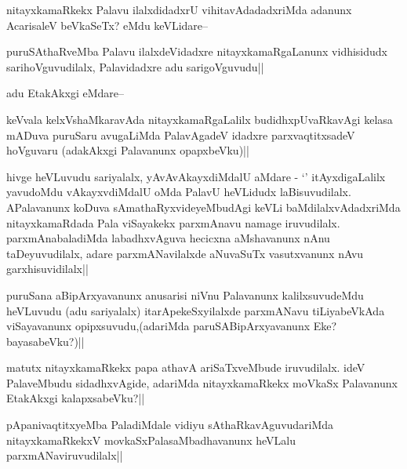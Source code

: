\begin{artha}
nitayxkamaRkekx Palavu ilalxdidadxrU vihitavAdadadxriMda adanunx AcarisaleV beVkaSeTx? eMdu keVLidare--
\end{artha}

\begin{artha}
puruSAthaRveMba Palavu ilalxdeVidadxre nitayxkamaRgaLanunx vidhisidudx sarihoVguvudilalx, Palavidadxre adu sarigoVguvudu||
\end{artha}

\begin{artha}
adu EtakAkxgi eMdare--
\end{artha}

\begin{artha}
keVvala kelxVshaMkaravAda  nitayxkamaRgaLalilx budidhxpUvaRkavAgi kelasa mADuva puruSaru avugaLiMda PalavAgadeV idadxre parxvaqtitxsadeV hoVguvaru (adakAkxgi Palavanunx opapxbeVku)||
\end{artha}


\begin{artha}
hivge heVLuvudu sariyalalx, yAvAvAkayxdiMdalU aMdare - `\stext' itAyxdigaLalilx yavudoMdu vAkayxvdiMdalU oMda PalavU heVLidudx laBisuvudilalx. APalavanunx koDuva sAmathaRyxvideyeMbudAgi keVLi baMdilalxvAdadxriMda nitayxkamaRdada Pala viSayakekx parxmAnavu namage iruvudilalx. parxmAnabaladiMda labadhxvAguva hecicxna aMshavanunx nAnu taDeyuvudilalx, adare parxmANavilalxde aNuvaSuTx vasutxvanunx nAvu garxhisuvidilalx||
\end{artha}

\begin{artha}
puruSana aBipArxyavanunx anusarisi niVnu Palavanunx kalilxsuvudeMdu heVLuvudu (adu 
sariyalalx) itarApekeSxyilalxde parxmANavu tiLiyabeVkAda viSayavanunx 
opipxsuvudu,(adariMda paruSABipArxyavanunx Eke?bayasabeVku?)||
\end{artha}

\begin{artha}
matutx nitayxkamaRkekx papa athavA ariSaTxveMbude iruvudilalx. ideV PalaveMbudu sidadhxvAgide, adariMda nitayxkamaRkekx moVkaSx Palavanunx EtakAkxgi kalapxsabeVku?||
\end{artha}

\begin{artha}
pApanivaqtitxyeMba PaladiMdale vidiyu sAthaRkavAguvudariMda nitayxkamaRkekxV movkaSxPalasaMbadhavanunx heVLalu parxmANaviruvudilalx||
\end{artha}


